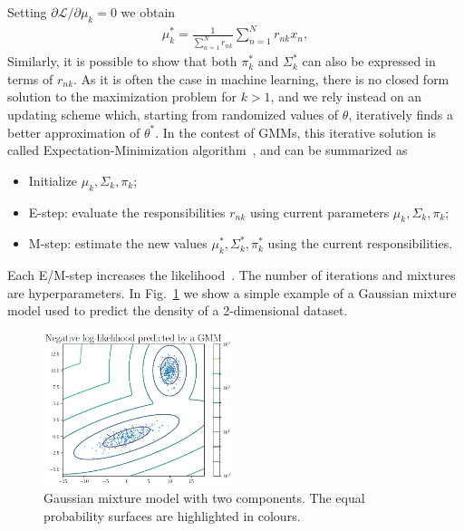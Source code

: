 %
Setting $\partial \mathcal{L} / \partial \mu_k  = 0$ we obtain
%
\begin{align}
\mu_k^{*} = \frac{1}{ \sum_{n=1}^{N} r_{nk}} \sum_{n=1}^{N} r_{nk} x_n,
\end{align}
%
Similarly, it is possible to show that both $\pi_k^{*}$ and $\Sigma_k^{*}$ can also be expressed in terms of $r_{nk}$. 
As it is often the case in machine learning, there is no closed form solution to the maximization problem for $k > 1$, and we rely instead on an updating scheme which, starting from randomized values of $\theta$, iteratively finds a better approximation of $\theta^{*}$.
In the contest of GMMs, this iterative solution is called Expectation-Minimization algorithm~\cite{ExpMin1}, and can be summarized as
%
\begin{itemize}
\item
Initialize $\mu_k, \Sigma_k, \pi_k$;
\item
E-step: evaluate the responsibilities $r_{nk}$ using current parameters $\mu_k, \Sigma_k, \pi_k$;
\item
M-step: estimate the new values $\mu_k^{*}, \Sigma_k^{*}, \pi_k^{*}$ using the current responsibilities.
\end{itemize}
Each E/M-step increases the likelihood~\cite{ExpMin2}. The number of iterations and mixtures are hyperparameters.
In Fig.~\ref{fig:gmm} we show a simple example of a Gaussian mixture model used to predict the density of a 2-dimensional dataset.
\begin{figure}[t]
\centering
\includegraphics[page = 1, width=0.49\textwidth]{./figures/gmm}
\caption{Gaussian mixture model with two components. The equal probability surfaces are highlighted in colours.}
\label{fig:gmm}
\end{figure}

